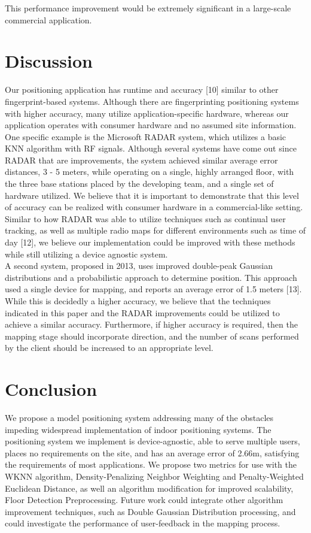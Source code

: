 \documentclass[conference]{IEEEtran}
\begin{document}
This performance improvement would be extremely significant in a large-scale commercial application.

\section{Discussion}
\indent Our positioning application has runtime and accuracy [10] similar to other fingerprint-based systems. Although there are fingerprinting positioning systems with higher accuracy, many utilize application-specific hardware, whereas our application operates with  consumer hardware and no assumed site information.\\
\indent One specific example is the Microsoft RADAR system, which utilizes a basic KNN algorithm with RF signals. Although several systems have come out since RADAR that are improvements, the system achieved similar average error distances, 3 - 5 meters, while operating on a single, highly arranged floor, with the three base stations placed by the developing team, and a single set of hardware utilized. We believe that it is important to demonstrate that this level of accuracy can be realized with consumer hardware in a commercial-like setting. Similar to how RADAR was able to utilize techniques such as continual user tracking, as well as multiple radio maps for different environments such as time of day [12], we believe our implementation could be improved with these methods while still utilizing a device agnostic system.\\
\indent A second system, proposed in 2013, uses improved double-peak Gaussian distributions and a probabilistic approach to determine position. This approach used a single device for mapping, and reports an average error of 1.5 meters [13]. While this is decidedly a higher accuracy, we believe that the techniques indicated in this paper and the RADAR improvements could be utilized to achieve a similar accuracy. Furthermore, if higher accuracy is required, then the mapping stage should incorporate direction, and the number of scans performed by the client should be increased to an appropriate level.


\section{Conclusion}
We propose a model positioning system addressing many of the obstacles impeding widespread implementation of indoor positioning systems. The positioning system we implement is device-agnostic, able to serve multiple users, places no requirements on the site, and has an average error of 2.66m, satisfying the requirements of most applications. We propose two metrics for use with the WKNN algorithm, Density-Penalizing Neighbor Weighting and Penalty-Weighted Euclidean Distance, as well an algorithm modification for improved scalability, Floor Detection Preprocessing. Future work could integrate other algorithm improvement techniques, such as Double Gaussian Distribution processing, and could investigate the performance of user-feedback in the mapping process.
\end{document}
